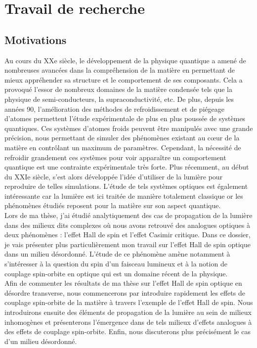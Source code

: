 \documentclass[a4paper,11pt]{article} %
\begin{document}
	
	\section{Travail de recherche}
	\subsection{Motivations}
	Au cours du XXe siècle, le développement de la physique quantique a amené de nombreuses avancées dans la compréhension de la matière en permettant de mieux appréhender sa structure et le comportement de ses composants. Cela a provoqué l'essor de nombreux domaines de la matière condensée tels que la physique de semi-conducteurs, la supraconductivité, etc. De plus, depuis les années 90, l'amélioration des méthodes de refroidissement et de piégeage d'atomes permettent l'étude expérimentale de plus en plus poussée de systèmes quantiques. Ces systèmes d'atomes froids peuvent être manipulés avec une grande précision, nous permettant de simuler des phénomènes existant au c\oe ur de la matière en contrôlant un maximum de paramètres. Cependant, la nécessité de refroidir grandement ces systèmes pour voir apparaître un comportement quantique est une contrainte expérimentale très forte. Plus récemment, au début du XXIe siècle, s'est alors développée l'idée d'utiliser de la lumière pour reproduire de telles simulations. L'étude de tels systèmes optiques est également intéressante car la lumière est ici traitée de manière totalement classique or les phénomènes étudiés reposent pour la matière sur son aspect quantique.\\
	
	Lors de ma thèse, j'ai étudié analytiquement des cas de propagation de la lumière dans des milieux dits complexes où nous avons retrouvé des analogues optiques à deux phénomènes : l'effet Hall de spin et l'effet Casimir critique. Dans ce dossier, je vais présenter plus particulièrement mon travail sur l'effet Hall de spin optique dans un milieu désordonné. L'étude de ce phénomène amène notamment à s'intéresser à la question du spin d'un faisceau lumineux et à la notion de couplage spin-orbite en optique qui est un domaine récent de la physique.\\
	
	Afin de commenter les résultats de ma thèse sur l'effet Hall de spin optique en désordre transverse, nous commencerons par introduire rapidement les effets de couplage spin-orbite de la matière à travers l'exemple de l'effet Hall de spin. Nous introduirons ensuite des éléments de propagation de la lumière au sein de milieux inhomogènes et présenterons l'émergence dans de tels milieux d'effets analogues à des effets de couplage spin-orbite. Enfin, nous discuterons plus précisément le cas d'un milieu désordonné.
	
\end{document}
